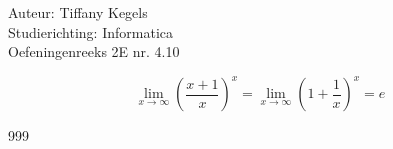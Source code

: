 \documentclass[a4paper]{article}
\begin{document}
	
	\noindent \large Auteur: Tiffany Kegels \\
	\noindent \large Studierichting: Informatica\\
	\noindent \large Oefeningenreeks 2E nr. 4.10\\
	
	\medskip
	
	\normalsize
	
$$\lim\limits_{x\rightarrow \infty} \left(\dfrac{x + 1}{x}\right)^x 
= \lim\limits_{x\rightarrow \infty} \left(1 + \dfrac{1}{x}\right)^x = e$$

	\begin{thebibliography}{999}
	\end{thebibliography}
\end{document}
